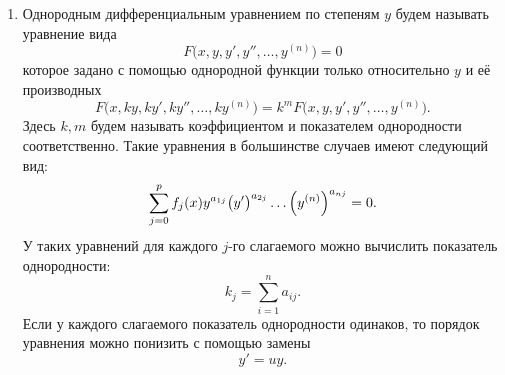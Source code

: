     \begin{enumerate}
        \item Однородным дифференциальным уравнением по степеням $ y $ будем называть уравнение вида
            \[
                F \Big( x, y, y', y'', \dots, y^{(n)} \Big) = 0
            \]
            которое задано с помощью однородной функции только относительно $ y $ и её производных
            \[
                F \Big( x, ky, ky', ky'', \dots, ky^{(n)} \Big) = k^m F \Big( x, y, y', y'', \dots, y^{(n)} \Big).
            \]
            Здесь $ k, m $ будем называть коэффициентом и показателем однородности соответственно. Такие уравнения в большинстве случаев имеют следующий вид:
            \[
                \sum^p_{j = 0} f_j(x) y^{a_{1j}} \bigl( y' \bigr)^{a_{2j}} \dots \Big( y^{(n)} \Big)^{a_{nj}} = 0.
            \]
            У таких уравнений для каждого $ j $-го слагаемого можно вычислить показатель однородности:
            \[
                k_j = \sum^n_{i = 1} a_{ij}.
            \]
            Если у каждого слагаемого показатель однородности одинаков, то порядок уравнения можно понизить с помощью замены
            \[
                y' = uy.
            \]


\end{enumerate}

